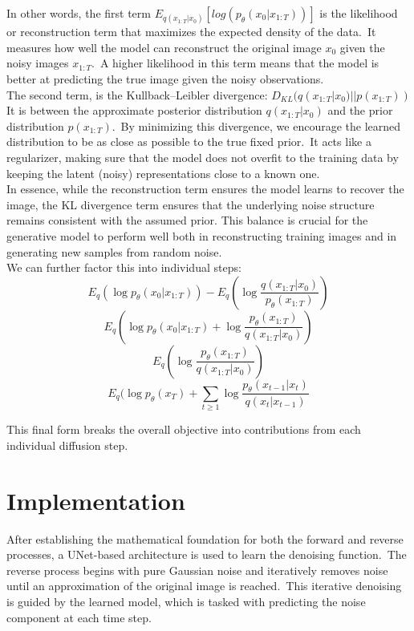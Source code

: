 \documentclass[12pt]{article}
\begin{document}
In other words, the first term $E_{q({x_{1:T}}|{x_0})} [log(p_{\theta}({x_0}|{x_{1:T}}))]$ is the likelihood or reconstruction term that maximizes the expected density of the data.\
It measures how well the model can reconstruct the original image ${x_0}$ given the noisy images ${x_{1:T}}$.\
A higher likelihood in this term means that the model is better at predicting the true image given the noisy observations. \\

The second term, is the Kullback–Leibler divergence: $D_{KL}(q({x_{1:T}}|{x_0})||p({x_{1:T}}))$
It is between the approximate posterior distribution \(q({x_{1:T}}|{x_0})\) and the prior distribution \(p({x_{1:T}})\).\
By minimizing this divergence, we encourage the learned distribution to be as close as possible to the true fixed prior.\
It acts like a regularizer, making sure that the model does not overfit to the training data by keeping the latent (noisy) representations close to a known one.\\

In essence, while the reconstruction term ensures the model learns to recover the image, the KL divergence term ensures that the underlying noise structure remains consistent with the assumed prior. 
This balance is crucial for the generative model to perform well both in reconstructing training images and in generating new samples from random noise.\\

We can further factor this into individual steps: 
\[{E_q}(\log {p_\theta }({x_0}|{x_{1:T}})) - {E_q}(\log \frac{{q({x_{1:T}}|{x_0})}}{{{p_\theta }({x_{1:T}})}})\]
\[{E_q}(\log {p_\theta }({x_0}|{x_{1:T}}) + \log \frac{{{p_\theta }({x_{1:T}})}}{{q({x_{1:T}}|{x_0})}})\]
\[{E_q}(\log \frac{{{p_\theta }({x_{1:T}})}}{{q({x_{1:T}}|{x_0})}})\]
\[{E_q}(\log {p_\theta }({x_T}) + \sum\limits_{t \ge 1} {\log } \frac{{{p_\theta }({x_{t - 1}}|{x_t})}}{{q({x_t}|{x_{t - 1}})}}\] 

This final form breaks the overall objective into contributions from each individual diffusion step.

\pagebreak
\section{Implementation}
After establishing the mathematical foundation for both the forward and reverse processes, a UNet-based architecture is used to learn the denoising function.\
The reverse process begins with pure Gaussian noise and iteratively removes noise until an approximation of the original image is reached.\
This iterative denoising is guided by the learned model, which is tasked with predicting the noise component at each time step.
\end{document}
